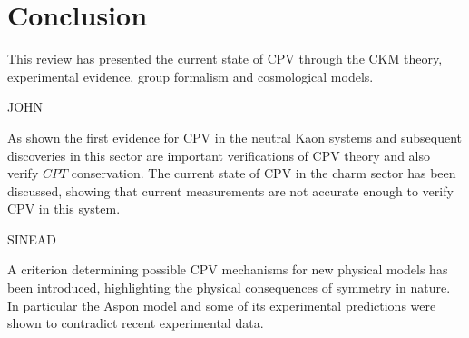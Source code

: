 \section{Conclusion}

This review has presented the current state of CPV through the CKM theory, experimental evidence, group formalism and cosmological models. 

JOHN

As shown the first evidence for CPV in the neutral Kaon systems and subsequent discoveries in this sector are important verifications of CPV theory and also verify $CPT$ conservation. The current state of CPV in the charm sector has been discussed, showing that current measurements are not accurate enough to verify CPV in this system. 

SINEAD

A criterion determining possible CPV mechanisms for new physical models has been introduced, highlighting the physical consequences of symmetry in nature. In particular the Aspon model and some of its experimental predictions were shown to contradict recent experimental data.